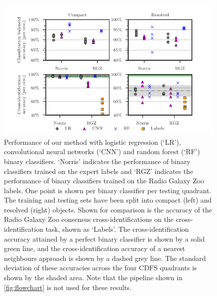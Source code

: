 \documentclass[11pt, a4paper]{book}
\begin{document}
    \begin{figure}
    \centering
    \includegraphics[width=1.0\linewidth]{atlas-images/cdfs-grid-new.pdf}
    \caption[Performance of our method with different binary classifiers on the binary classification task.]{Performance of our method with logistic regression (`LR'), convolutional neural networks (`CNN') and random forest (`RF') binary classifiers. `Norris' indicates the performance of binary classifiers trained on the expert labels and `RGZ' indicates the performance of binary classifiers trained on the Radio Galaxy Zoo labels. One point is shown per binary classifier per testing quadrant. The training and testing sets have been split into compact (left) and resolved (right) objects. {Shown for comparison is the accuracy of the Radio Galaxy Zoo consensus cross-identifications on the cross-identification task, shown as `Labels'.} The cross-identification accuracy attained by a perfect binary classifier is shown by a solid green line, and the cross-identification accuracy of a nearest neighbours approach is shown by a dashed grey line. The standard deviation of these accuracies across the four CDFS quadrants is shown by the shaded area. Note that the pipeline shown in \autoref{fig:flowchart} is not used for these results. \label{fig:ba}}
    \end{figure}
\end{document}
